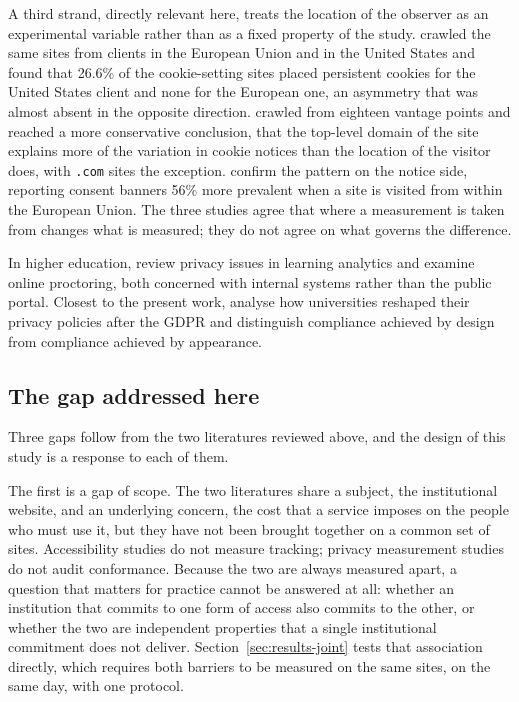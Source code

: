 \documentclass[pdflatex,sn-basic,Numbered,iicol]{sn-jnl}
\theoremstyle{thmstyleone}
\theoremstyle{thmstyletwo}
\theoremstyle{thmstylethree}
\begin{document}
A third strand, directly relevant here, treats the location of the observer as an experimental variable rather than as a fixed property of the study. \citet{dabrowski2019measuring} crawled the same sites from clients in the European Union and in the United States and found that 26.6\% of the cookie-setting sites placed persistent cookies for the United States client and none for the European one, an asymmetry that was almost absent in the opposite direction. \citet{vaneijk2019impact} crawled from eighteen vantage points and reached a more conservative conclusion, that the top-level domain of the site explains more of the variation in cookie notices than the location of the visitor does, with \texttt{.com} sites the exception. \citet{rasaii2023exploring} confirm the pattern on the notice side, reporting consent banners 56\% more prevalent when a site is visited from within the European Union. The three studies agree that where a measurement is taken from changes what is measured; they do not agree on what governs the difference.

In higher education, \citet{liu2023understanding} review privacy issues in learning analytics and \citet{mutimukwe2026privacy} examine online proctoring, both concerned with internal systems rather than the public portal. Closest to the present work, \citet{munot2025compliance} analyse how universities reshaped their privacy policies after the GDPR and distinguish compliance achieved by design from compliance achieved by appearance.

\subsection{The gap addressed here}\label{sec:related-gap}

Three gaps follow from the two literatures reviewed above, and the design of this study is a response to each of them.

The first is a gap of scope. The two literatures share a subject, the institutional website, and an underlying concern, the cost that a service imposes on the people who must use it, but they have not been brought together on a common set of sites. Accessibility studies do not measure tracking; privacy measurement studies do not audit conformance. Because the two are always measured apart, a question that matters for practice cannot be answered at all: whether an institution that commits to one form of access also commits to the other, or whether the two are independent properties that a single institutional commitment does not deliver. Section~\ref{sec:results-joint} tests that association directly, which requires both barriers to be measured on the same sites, on the same day, with one protocol.
\end{document}
